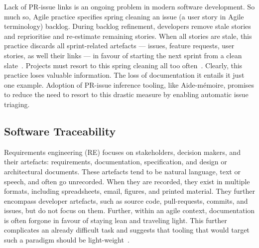 Lack of PR-issue links is an ongoing problem in modern software development.  So
much so, Agile practice specifies spring cleaning an issue (a user story in
Agile terminology) backlog. During backlog refinement, developers remove stale
stories and reprioritise and re-estimate remaining stories. When all stories are
stale, this practice discards all sprint-related artefacts --- issues, feature
requests, user stories, as well their links --- in favour of starting the next
sprint from a clean slate~\cite{BacklogRefinement}. Projects must resort to this
spring cleaning all too often~\cite{laurieTrattPersonalCommunciation}. Clearly,
this practice loses valuable information. The loss of documentation it entails
it just one example. Adoption of PR-issue inference tooling, like Aide-mémoire,
promises to reduce the need to resort to this drastic measure by enabling
automatic issue triaging.

\subsection{Software Traceability}
\label{chapter:literature:sec:am_rel_work:tracability}

Requirements engineering (RE) focuses on stakeholders, decision makers, and
their artefacts: requirements, documentation, specification, and design or
architectural documents. These artefacts tend to be natural language, text or
speech, and often go unrecorded. When they are recorded, they exist in multiple
formats, including spreadsheets, email, figures, and printed material. They
further encompass developer artefacts, such as source code, pull-requests,
commits, and issues, but do not focus on them. Further, within an agile context,
documentation is often forgone in favour of staying lean and traveling light.
This further complicates an already difficult task and suggests that tooling
that would target such a paradigm should be light-weight~\cite{Stahl2017}.


